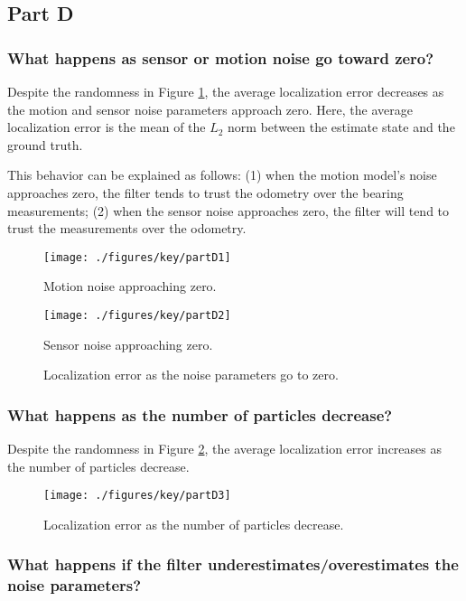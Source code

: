 \documentclass[11pt, oneside, letterpaper]{article}
\begin{document}
\subsection*{Part D}

\subsubsection*{What happens as sensor or motion noise go toward zero?}

Despite the randomness in Figure \ref{fig:NoiseApproachingZero}, the average localization error decreases as the motion and sensor noise parameters approach zero. Here, the average localization error is the mean of the $L_2$ norm between the estimate state and the ground truth.

This behavior can be explained as follows: (1) when the motion model's noise approaches zero, the filter tends to trust the odometry over the bearing measurements; (2) when the sensor noise approaches zero, the filter will tend to trust the measurements over the odometry.

\begin{figure}[!htb]
    \texttt{[image: ./figures/key/partD1]}
    \caption*{Motion noise approaching zero.}
\endminipage\hfill
{}
    \texttt{[image: ./figures/key/partD2]}
    \caption*{Sensor noise approaching zero.}
\endminipage\hfill
\caption{Localization error as the noise parameters go to zero.}
\label{fig:NoiseApproachingZero}
\end{figure}

\subsubsection*{What happens as the number of particles decrease?}

Despite the randomness in Figure \ref{fig:nParticlesDecreasing}, the average localization error increases as the number of particles decrease.

\begin{figure}[!htb]
\centering
\texttt{[image: ./figures/key/partD3]}
\caption{Localization error as the number of particles decrease.}
\label{fig:nParticlesDecreasing}
\end{figure}

\subsubsection*{What happens if the filter underestimates/overestimates the noise parameters?}
\end{document}
